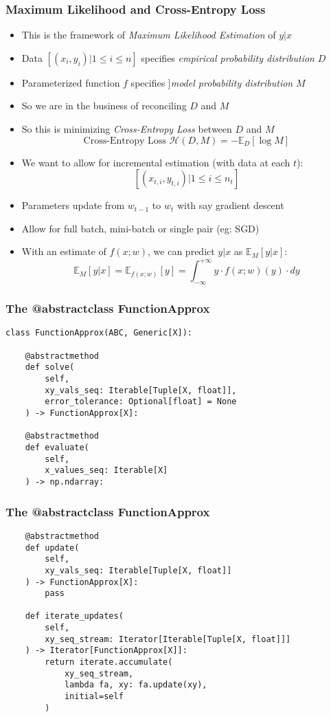 \documentclass[handout]{beamer}
\begin{document}
\begin{frame}
\frametitle{Maximum Likelihood and Cross-Entropy Loss}
\pause
\begin{itemize}[<+->]
\item This is the framework of {\em Maximum Likelihood Estimation} of $y|x$
\item Data $[(x_i, y_i)|1 \leq i \leq n]$ specifies {\em empirical probability distribution} $D$
\item Parameterized function $f$ specifies {]\em model probability distribution} $M$
\item So we are in the business of reconciling $D$ and $M$
\item So this is minimizing {\em Cross-Entropy Loss} between $D$ and $M$
$$ \text{Cross-Entropy Loss } \mathcal{H}(D, M) = -\mathbb{E}_D[\log M]$$
\item We want to allow for incremental estimation (with data at each $t$):
$$[(x_{t,i}, y_{t,i})|1 \leq i \leq n_t]$$
\item Parameters update from $w_{t-1}$ to $w_t$ with say gradient descent
\item Allow for full batch, mini-batch or single pair (eg: SGD)
\item With an estimate of $f(x;w)$, we can predict $y|x$ as $\mathbb{E}_M[y|x]$:
$$\mathbb{E}_M[y|x] = \mathbb{E}_{f(x;w)}[y] = \int_{-\infty}^{+\infty} y \cdot f(x;w)(y) \cdot dy$$
\end{itemize}
\end{frame}


\begin{frame}[fragile]
\frametitle{The @abstractclass FunctionApprox}
\pause
\begin{lstlisting}
class FunctionApprox(ABC, Generic[X]):

    @abstractmethod
    def solve(
        self,
        xy_vals_seq: Iterable[Tuple[X, float]],
        error_tolerance: Optional[float] = None
    ) -> FunctionApprox[X]:
    
    @abstractmethod
    def evaluate(
        self,
        x_values_seq: Iterable[X]
    ) -> np.ndarray:
\end{lstlisting}
\end{frame}

\begin{frame}[fragile]
\frametitle{The @abstractclass FunctionApprox}
\pause
\begin{lstlisting}
    @abstractmethod
    def update(
        self,
        xy_vals_seq: Iterable[Tuple[X, float]]
    ) -> FunctionApprox[X]:
        pass
        
    def iterate_updates(
        self,
        xy_seq_stream: Iterator[Iterable[Tuple[X, float]]]
    ) -> Iterator[FunctionApprox[X]]:
        return iterate.accumulate(
            xy_seq_stream,
            lambda fa, xy: fa.update(xy),
            initial=self
        )   
\end{lstlisting}
\end{frame}
\end{document}
